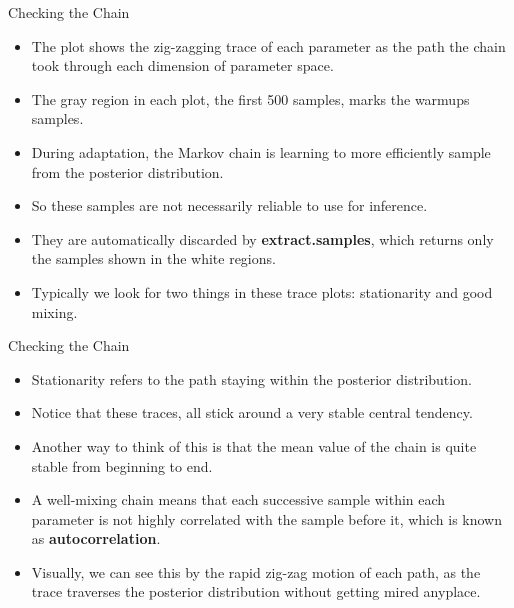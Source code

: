 \documentclass[handout]{beamer}
\begin{document}
\begin{frame}[fragile]{Checking the Chain }
\scriptsize{


\begin{itemize}


\item The plot shows the zig-zagging trace of each parameter as the path the chain took through each dimension of parameter space.

\item The gray region in each plot, the first 500 samples, marks the warmups samples.

\item During adaptation, the Markov chain is learning to more efficiently sample from the posterior distribution.

\item So these samples are not necessarily reliable to use for inference. 
\item They are automatically discarded by \textbf{extract.samples}, which returns only the samples shown in the white regions.


\item Typically we look for two things in these trace plots: stationarity and good mixing. 

 \end{itemize}




} 
\end{frame}


\begin{frame}[fragile]{Checking the Chain }
\scriptsize{


\begin{itemize}


\item Stationarity refers to the path staying within the posterior distribution. 

\item Notice that these traces, all stick around a very stable central tendency.

\item Another way to think of this is that the mean value of the chain is quite stable from beginning to end.

\item A well-mixing chain means that each successive sample within each parameter is not highly correlated with the sample before it, which is known as \textbf{autocorrelation}.

\item Visually, we can see this by the rapid zig-zag motion of each path, as the trace traverses the posterior distribution without getting mired
anyplace.

 \end{itemize}




} 
\end{frame}
\end{document}
